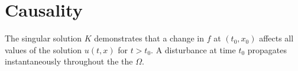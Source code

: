 %
%
%
\section{Causality}
The singular solution $K$ demonstrates that a change in $f$ at
$(t_0,x_0)$ affects all values of the solution $u(t,x)$ for $t>t_0$.
A disturbance at time $t_0$ propagates instantaneously throughout
the the $\Omega$.

